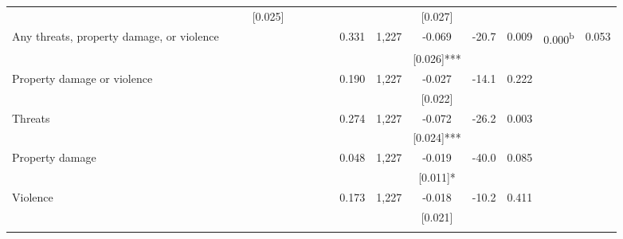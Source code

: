 \begin{tabular}{lcccccccccccccc}
 &  &  & [0.025] &  &  &  &  &  &  & [0.027] &  &  &  & \\
\phantom{} Any threats, property damage, or violence \phantom{} &  &  &  &  &  &  &  & 0.331 & 1,227 & -0.069 & -20.7 & 0.009 & 0.000\textsuperscript{b} & 0.053\\
 &  &  &  &  &  &  &  &  &  & [0.026]*** &  &  &  & \\
\quad Property damage or violence \phantom{} &  &  &  &  &  &  &  & 0.190 & 1,227 & -0.027 & -14.1 & 0.222 &  & \\
 &  &  &  &  &  &  &  &  &  & [0.022] &  &  &  & \\
\quad Threats \phantom{} &  &  &  &  &  &  &  & 0.274 & 1,227 & -0.072 & -26.2 & 0.003 &  & \\
 &  &  &  &  &  &  &  &  &  & [0.024]*** &  &  &  & \\
\quad Property damage \phantom{} &  &  &  &  &  &  &  & 0.048 & 1,227 & -0.019 & -40.0 & 0.085 &  & \\
 &  &  &  &  &  &  &  &  &  & [0.011]* &  &  &  & \\
\quad Violence \phantom{} &  &  &  &  &  &  &  & 0.173 & 1,227 & -0.018 & -10.2 & 0.411 &  & \\
 &  &  &  &  &  &  &  &  &  & [0.021] &  &  &  & \\
\noalign{\smallskip}\hline\end{tabular}
